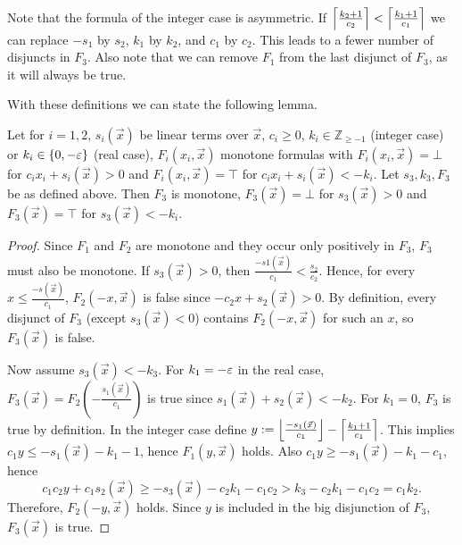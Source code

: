 \begin{techreport}

Note that the formula of the integer case is asymmetric.  If
$\left\lceil \frac{k_2+1}{c_2} \right\rceil < \left\lceil \frac{k_1+1}{c_1} \right\rceil$ we can replace $-s_1$
by $s_2$, $k_1$ by $k_2$, and $c_1$ by $c_2$.  This leads to a fewer 
number of disjuncts in $F_3$.
\ifnewinterpolation  
Also note that we can remove $F_1$ from the last disjunct of $F_3$, 
as it will always be true. \fi


\end{techreport}

With these definitions we can state the following lemma.
\ifnewinterpolation
\begin{lemma}\label{lemma_la}
  Let for $i=1,2$, $s_i(\vec x)$ be linear terms over $\vec x$,
  $c_i \geq 0$, $k_i \in\mathbb{Z}_{\geq -1}$
  (integer case) or $k_i\in\{0,-\varepsilon\}$ (real case), 
  $F_i(x_i,\vec x)$ monotone formulas with
  $F_i(x_i,\vec x)= \bot$ for $c_i x_i + s_i(\vec x) > 0$ and 
  $F_i(x_i,\vec x)= \top$ for $c_i x_i + s_i(\vec x) < -k_i$.  
  Let $s_3,k_3, F_3$ be as defined above.
  Then $F_3$ is monotone, $F_3(\vec x)=\bot$ for $s_3(\vec x) > 0$ and
  $F_3(\vec x)=\top$ for $s_3(\vec x)< -k_i$.
\end{lemma}
\begin{proof}
  Since $F_1$ and $F_2$ are monotone and they occur only positively in
  $F_3$, $F_3$ must also be monotone.  If $s_3(\vec x)> 0$, then
  $\frac{-s1(\vec x)}{c_1} < \frac{s_2}{c_2}$.  Hence, for 
  every $x \leq \frac{-s(\vec x)}{c_1}$, $F_2(-x, \vec x)$ is false 
  since $-c_2 x + s_2(\vec x) > 0$.  By definition, every disjunct 
  of $F_3$ (except $s_3(\vec x) < 0$) 
  contains $F_2(-x,\vec x)$ for such an $x$, so $F_3(\vec x)$ 
  is false.

  Now assume $s_3(\vec x) < -k_3$. For $k_1=-\varepsilon$ in the real case,
  $F_3(\vec x) =
  F_2(-\frac{s_1(\vec x)}{c_1})$ is true since $s_1(\vec x) + s_2(\vec
  x) < -k_2$.  For $k_1=0$, $F_3$ is true by definition.
  In the integer case define $y := \left\lfloor \frac{-s_1(\vec x)}{c_1} \right\rfloor -
  \left\lceil \frac{k_1+1}{c_1} \right\rceil$.  
  This implies $c_1 y \leq -s_1(\vec x)-k_1-1$, hence $F_1(y, \vec x)$ holds.
  Also $c_1 y \geq -s_1(\vec x)-k_1-c_1$, hence
  \[c_1c_2y + c_1s_2(\vec x) \geq -s_3(\vec x) - c_2k_1 - c_1c_2 > k_3 - c_2k_1 - c_1c_2 =  c_1k_2.\]
  Therefore, $F_2(-y,\vec x)$ holds. Since $y$ is included in the big
  disjunction of $F_3$, $F_3(\vec x)$ is true.
\end{proof}
\fi

